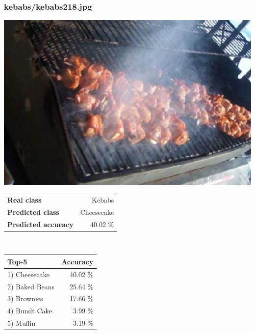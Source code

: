 \subsubsection{kebabs/kebabs218.jpg}

\begin{minipage}[t]{0.4\textwidth}
	\vspace{0pt}
	\includegraphics[width=\linewidth]{images/evaluation-images/kebabs/kebabs218.jpg}
\end{minipage}
\hfill
\begin{minipage}[t]{0.5\textwidth}
	\vspace{0pt}\raggedright
	\begin{tabularx}{\textwidth}{X r}
		\small \textbf{Real class} & \small Kebabs\\
		\small \textbf{Predicted class} & \small Cheesecake\\
		\small \textbf{Predicted accuracy} & \small 40.02 \%
    \end{tabularx}\\
    
    \vspace{6pt}
	\begin{tabularx}{\textwidth}{X r}
        \small \textbf{Top-5} & \small \textbf{Accuracy} \\
        \hline
		\small 1) Cheesecake & \small 40.02 \%\\\small 2) Baked Beans & \small 25.64 \%\\\small 3) Brownies & \small 17.66 \%\\\small 4) Bundt Cake & \small 3.99 \%\\\small 5) Muffin & \small 3.19 \%
    \end{tabularx}
\end{minipage}
    
